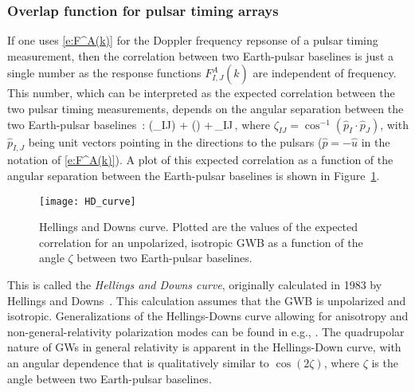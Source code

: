 \subsubsection{Overlap function for pulsar timing arrays}

If one uses \eqref{e:F^A(k)} for the Doppler frequency
repsonse of a pulsar timing measurement, then the correlation
between two Earth-pulsar baselines is just a single number as 
the response functions $F^A_{I,J}(\hat k)$ are independent of
frequency.
This number, which can be interpreted as the expected
correlation between the two pulsar timing measurements, 
depends on the angular separation between the two 
Earth-pulsar baselines~\cite{Hellings-Downs:1983}:
%
\be
\chi(\zeta_{IJ})\equiv
{} + \left(\right)
+\,\delta_{IJ}\,,
\label{e:HD}
\ee
%
where $\zeta_{IJ} = \cos^{-1}(\hat p_I\cdot\hat p_J)$, with 
$\hat p_{I,J}$ being unit vectors pointing in the directions
to the pulsars ($\hat p=-\hat u$ in the notation 
of \eqref{e:F^A(k)}).
A plot of this expected correlation as a function of the 
angular separation between the Earth-pulsar baselines is
shown in Figure~\ref{f:HD_curve}.
%
\begin{figure}[htbp!]
\begin{center}
\texttt{[image: HD\_curve]}
\caption{Hellings and Downs curve.
Plotted are the values of the expected correlation for 
an unpolarized,
isotropic GWB as a function of the angle $\zeta$ between
two Earth-pulsar baselines.}
\label{f:HD_curve}
\end{center}
\end{figure}
%
This is called the {\em Hellings and Downs curve}, originally 
calculated in 1983 by Hellings and Downs~\cite{Hellings-Downs:1983}.
This calculation assumes that the GWB is unpolarized
and isotropic.
Generalizations of the Hellings-Downs curve allowing for 
anisotropy and non-general-relativity polarization modes
can be found in e.g., \cite{Mingarelli-et-al:2013, 
Gair-et-al:2014, Lee-et-al:2007, Chamberlin-Siemens:2012, Gair-et-al:2015}.
The quadrupolar nature of GWs in general relativity is
apparent in the Hellings-Down curve, with an angular dependence
that is qualitatively similar to $\cos(2\zeta)$, where 
$\zeta$ is the angle between two Earth-pulsar baselines.

